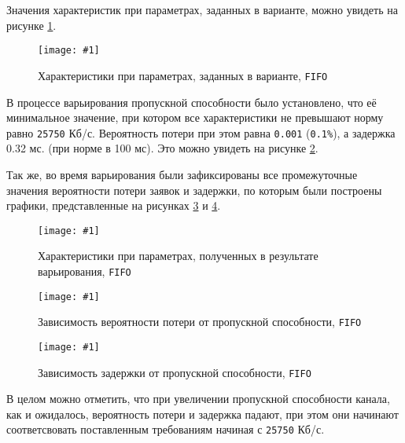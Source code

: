 \documentclass[12pt, a4paper]{article}
\newcommand{\figc}[4]{
  \begin{figure}[H]
  \begin{center}
    \texttt{[image: \#1]}
    \caption{#2}
    \label{fig:#3}
  \end{center}
  \end{figure}
}
\begin{document}
Значения характеристик при параметрах, заданных в варианте, можно увидеть
на рисунке \ref{fig:f_v}.

\figc{bp/C4E10BP}{Характеристики при параметрах, заданных в варианте, \texttt{FIFO}}{f_v}{1.0}

В процессе варьирования пропускной способности было установлено, что
её минимальное значение, при котором все характеристики не превышают
норму равно \texttt{25750} Кб/с. Вероятность потери при этом равна
\texttt{0.001} (\texttt{0.1\%}), а задержка 0.32 мс. (при норме в 100 мс).
Это можно увидеть на рисунке \ref{fig:f_c}.

Так же, во время варьирования были зафиксированы
все промежуточные значения вероятности потери заявок и задержки, по которым
были построены графики, представленные на рисунках \ref{fig:f_l} и \ref{fig:f_d}.

\figc{bp/C25_75E10BP}{Характеристики при параметрах, полученных в результате варьирования, \texttt{FIFO}}{f_c}{1.0}
\figc{charts/bp_loss}{Зависимость вероятности потери от пропускной способности, \texttt{FIFO}}{f_l}{0.8}
\figc{charts/bp_delay}{Зависимость задержки от пропускной способности, \texttt{FIFO}}{f_d}{0.8}

В целом можно отметить, что при увеличении пропускной способности канала, как
и ожидалось, вероятность потери и задержка падают, при этом они начинают соответсвовать
поставленным требованиям начиная с \texttt{25750} Кб/с.
\end{document}
